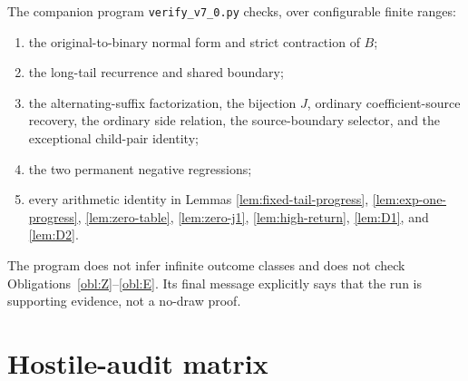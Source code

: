 The companion program \texttt{verify\_v7\_0.py} checks, over configurable
finite ranges:
\begin{enumerate}[label=(\arabic*)]
\item the original-to-binary normal form and strict contraction of $B$;
\item the long-tail recurrence and shared boundary;
\item the alternating-suffix factorization, the bijection $J$, ordinary
      coefficient-source recovery, the ordinary side relation, the
      source-boundary selector, and the exceptional child-pair identity;
\item the two permanent negative regressions;
\item every arithmetic identity in Lemmas
      \ref{lem:fixed-tail-progress}, \ref{lem:exp-one-progress},
      \ref{lem:zero-table}, \ref{lem:zero-j1},
      \ref{lem:high-return}, \ref{lem:D1}, and \ref{lem:D2}.
\end{enumerate}
The program does not infer infinite outcome classes and does not check
Obligations~\ref{obl:Z}--\ref{obl:E}.  Its final message explicitly says
that the run is supporting evidence, not a no-draw proof.

\section{Hostile-audit matrix}

